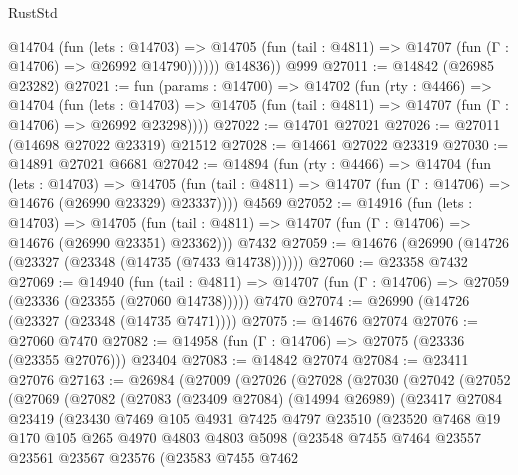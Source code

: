 \begin{lexlean}{RustStd}
\begin{coremodule}
            @14704
              (fun (lets : @14703) =>
              @14705 (fun (tail : @4811) => @14707 (fun (Γ : @14706) => @26992 @14790))))))
        @14836))
    @999
@27011 := @14842 (@26985 @23282)
@27021 := fun (params : @14700) =>
  @14702
    (fun (rty : @4466) =>
    @14704
      (fun (lets : @14703) =>
      @14705 (fun (tail : @4811) => @14707 (fun (Γ : @14706) => @26992 @23298))))
@27022 := @14701 @27021
@27026 := @27011 (@14698 @27022 @23319) @21512
@27028 := @14661 @27022 @23319
@27030 := @14891 @27021 @6681
@27042 := @14894
    (fun (rty : @4466) =>
    @14704
      (fun (lets : @14703) =>
      @14705 (fun (tail : @4811) => @14707 (fun (Γ : @14706) => @14676 (@26990 @23329) @23337))))
    @4569
@27052 := @14916
    (fun (lets : @14703) =>
    @14705 (fun (tail : @4811) => @14707 (fun (Γ : @14706) => @14676 (@26990 @23351) @23362)))
    @7432
@27059 := @14676 (@26990 (@14726 (@23327 (@23348 (@14735 (@7433 @14738))))))
@27060 := @23358 @7432
@27069 := @14940
    (fun (tail : @4811) => @14707 (fun (Γ : @14706) => @27059 (@23336 (@23355 (@27060 @14738)))))
    @7470
@27074 := @26990 (@14726 (@23327 (@23348 (@14735 @7471))))
@27075 := @14676 @27074
@27076 := @27060 @7470
@27082 := @14958 (fun (Γ : @14706) => @27075 (@23336 (@23355 @27076))) @23404
@27083 := @14842 @27074
@27084 := @23411 @27076
@27163 := @26984
    (@27009
      (@27026
        (@27028
          (@27030
            (@27042
              (@27052
                (@27069
                  (@27082
                    (@27083
                      (@23409 @27084)
                      (@14994 @26989)
                      (@23417
                        @27084
                        @23419
                        (@23430
                          @7469
                          @105
                          @4931
                          @7425
                          @4797
                          @23510
                          (@23520
                            @7468
                            @19
                            @170
                            @105
                            @265
                            @4970
                            @4803
                            @4803
                            @5098
                            (@23548
                              @7455
                              @7464
                              @23557
                              @23561
                              @23567
                              @23576
                              (@23583
                                @7455
                                @7462

\end{coremodule}
\end{lexlean}
